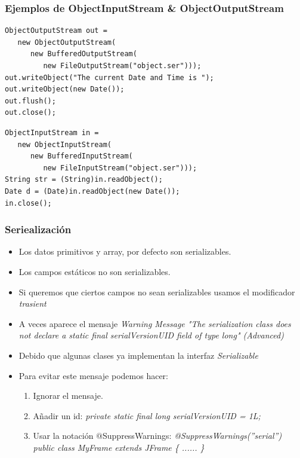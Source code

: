 \documentclass{beamer}
\begin{document}
\begin{frame}[fragile]
\frametitle{Ejemplos de ObjectInputStream \& ObjectOutputStream}
\begin{verbatim}
ObjectOutputStream out =
   new ObjectOutputStream(
      new BufferedOutputStream(
         new FileOutputStream("object.ser")));
out.writeObject("The current Date and Time is "); 
out.writeObject(new Date());                      
out.flush();
out.close();
\end{verbatim}
\pause
\begin{verbatim}
ObjectInputStream in = 
   new ObjectInputStream(
      new BufferedInputStream(
         new FileInputStream("object.ser")));
String str = (String)in.readObject();
Date d = (Date)in.readObject(new Date());  
in.close();
\end{verbatim}
\end{frame}

\begin{frame}[fragile]
\frametitle{Seriealización}
\begin{itemize}[<+->]
\item Los datos primitivos y array, por defecto son serializables.
\item Los campos estáticos no son serializables.
\item Si queremos que ciertos campos no sean serializables usamos el modificador \emph{trasient}
\item A veces aparece el mensaje \emph{Warning Message "The serialization class does not declare a static final serialVersionUID field of type long" (Advanced)}
\item Debido que algunas clases ya implementan la interfaz \emph{Serializable}
\item Para evitar este mensaje podemos hacer:
\begin{enumerate}
\item Ignorar el mensaje.
\item Añadir un id: \emph{private static final long serialVersionUID = 1L;}
\item Usar la notación $@$SuppressWarnings: \emph{@SuppressWarnings(''serial'')
public class MyFrame extends JFrame \{ ...... \}}
\end{enumerate}
\end{itemize}
\end{frame}
\end{document}
